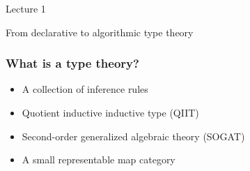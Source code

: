 \documentclass[handout,11pt,aspectratio=169]{beamer}
\begin{document}
\begin{frame}
  \begin{center}
    \Huge Lecture 1

    \bigskip

    \Large
    From declarative to algorithmic type theory
  \end{center}
\end{frame}


\begin{frame}
  \frametitle{What is a type theory?}

  \begin{itemize}
  \item A collection of inference rules
  \item Quotient inductive inductive type (QIIT)
  \item Second-order generalized algebraic theory (SOGAT)
  \item A small representable map category
  \end{itemize}

\end{frame}
\end{document}

